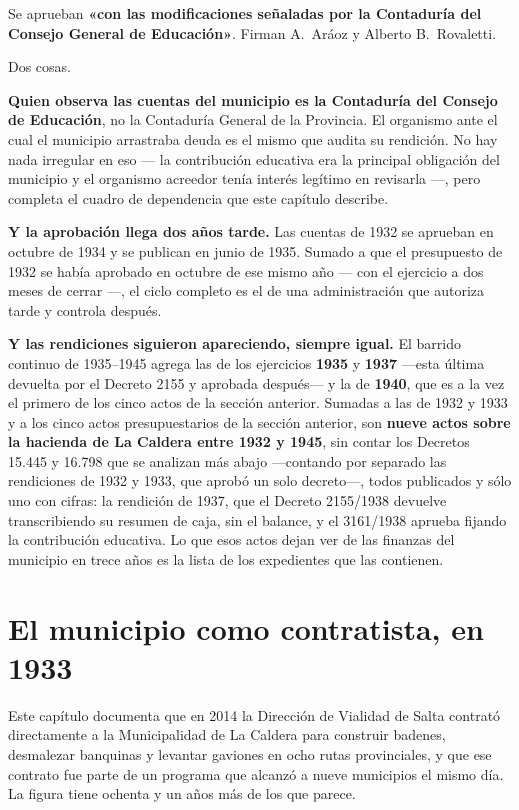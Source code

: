 Se aprueban \textbf{«con las modificaciones señaladas por la Contaduría del Consejo General de
Educación»}. Firman A.\ Aráoz y Alberto B.\ Rovaletti.

Dos cosas.

\textbf{Quien observa las cuentas del municipio es la Contaduría del Consejo de Educación},
no la Contaduría General de la Provincia. El organismo ante el cual el municipio arrastraba
deuda es el mismo que audita su rendición. No hay nada irregular en eso --- la contribución
educativa era la principal obligación del municipio y el organismo acreedor tenía interés
legítimo en revisarla ---, pero completa el cuadro de dependencia que este capítulo describe.

\textbf{Y la aprobación llega dos años tarde.} Las cuentas de 1932 se aprueban en octubre de
1934 y se publican en junio de 1935. Sumado a que el presupuesto de 1932 se había aprobado
en octubre de ese mismo año --- con el ejercicio a dos meses de cerrar ---, el ciclo completo
es el de una administración que autoriza tarde y controla después.

\textbf{Y las rendiciones siguieron apareciendo, siempre igual.} El barrido continuo de
1935--1945 agrega las de los ejercicios \textbf{1935} y \textbf{1937} ---esta última devuelta
por el Decreto 2155 y aprobada después--- y la de \textbf{1940}, que es a la vez el primero de los cinco actos de la sección anterior. Sumadas a las de 1932 y 1933
y a los cinco actos presupuestarios de la sección anterior, son \textbf{nueve actos sobre la
hacienda de La Caldera entre 1932 y 1945}, sin contar los Decretos 15.445 y 16.798 que se analizan más abajo ---contando por separado las rendiciones de 1932 y 1933, que aprobó un solo decreto---, todos publicados y sólo uno con cifras: la rendición de 1937, que el Decreto 2155/1938 devuelve transcribiendo su resumen de caja, sin el balance, y el 3161/1938 aprueba fijando la contribución educativa. Lo que esos
actos dejan ver de las finanzas del municipio en trece años es la lista de los expedientes
que las contienen.

\section{El municipio como contratista, en 1933}

Este capítulo documenta que en 2014 la Dirección de Vialidad de Salta contrató directamente
a la Municipalidad de La Caldera para construir badenes, desmalezar banquinas y levantar
gaviones en ocho rutas provinciales, y que ese contrato fue parte de un programa que alcanzó
a nueve municipios el mismo día. La figura tiene ochenta y un años más de los que parece.

